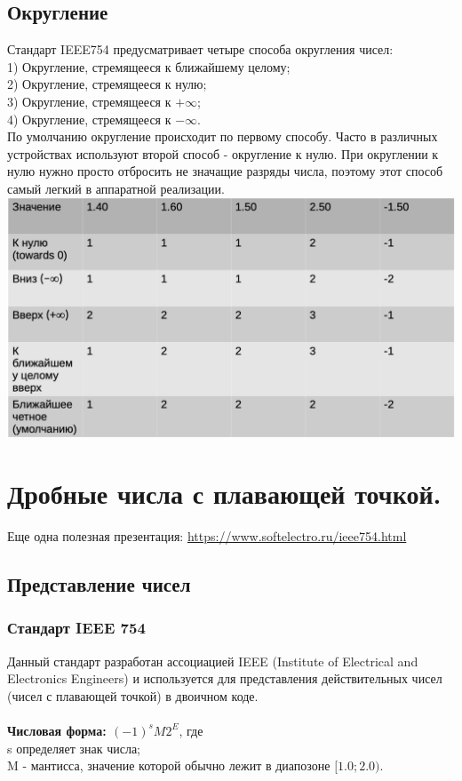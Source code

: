 \documentclass[12pt]{article}
\begin{document}
\subsection{Округление}
Стандарт IEEE754 предусматривает четыре способа округления чисел: \\
1) Округление, стремящееся к ближайшему целому; \\
2) Округление, стремящееся к нулю; \\
3) Округление, стремящееся к $+\infty$; \\
4) Округление, стремящееся к $-\infty$. \\
По умолчанию округление происходит по первому способу. Часто в различных устройствах используют второй способ - округление к нулю. При округлении к нулю нужно просто отбросить не значащие разряды числа, поэтому этот способ самый легкий в аппаратной реализации. \\
\includegraphics[scale=0.4]{./round.png} 

\section{Дробные числа с плавающей точкой.}
Еще одна полезная презентация: \textcolor{blue}{\href{https://www.softelectro.ru/ieee754.html}{https://www.softelectro.ru/ieee754.html}}

\subsection{Представление чисел}

\subsubsection*{Стандарт IEEE 754}
Данный стандарт разработан ассоциацией IEEE (Institute of Electrical and Electronics Engineers) и используется для представления действительных чисел (чисел с плавающей точкой) в двоичном коде. \\
\\
\textbf{Числовая форма: $ (-1)^{s} M 2^{E}$}, где \\
s определяет знак числа; \\
M - мантисса, значение которой обычно лежит в диапозоне $[1.0; 2.0)$. 
\end{document}
